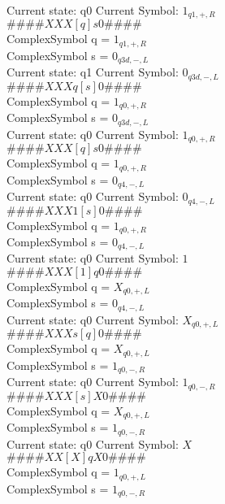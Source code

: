 \documentclass[10pt, a4paper]{article}
\begin{document}
 \medskip
Current state: q0	 Current Symbol: 	 $1_{q1,+,R}$\\
$\# \#\# \# X X X [ q ] s 0 \# \# \# \# $ \\
ComplexSymbol q = $1_{q1,+,R}$ \\
ComplexSymbol s = $0_{q3d,-,L}$ \\ 
 \medskip
Current state: q1	 Current Symbol: 	 $0_{q3d,-,L}$\\
$\# \#\# \# X X X q [ s ] 0 \# \# \# \# $ \\
ComplexSymbol q = $1_{q0,+,R}$ \\
ComplexSymbol s = $0_{q3d,-,L}$ \\ 
 \medskip
Current state: q0	 Current Symbol: 	 $1_{q0,+,R}$\\
$\# \#\# \# X X X [ q ] s 0 \# \# \# \# $ \\
ComplexSymbol q = $1_{q0,+,R}$ \\
ComplexSymbol s = $0_{q4,-,L}$ \\ 
 \medskip
Current state: q0	 Current Symbol: 	 $0_{q4,-,L}$\\
$\# \#\# \# X X X 1 [ s ] 0 \# \# \# \# $ \\
ComplexSymbol q = $1_{q0,+,R}$ \\
ComplexSymbol s = $0_{q4,-,L}$ \\ 
 \medskip
Current state: q0	 Current Symbol: 	 $1$\\
$\# \#\# \# X X X [ 1 ] q 0 \# \# \# \# $ \\
ComplexSymbol q = $X_{q0,+,L}$ \\
ComplexSymbol s = $0_{q4,-,L}$ \\ 
 \medskip
Current state: q0	 Current Symbol: 	 $X_{q0,+,L}$\\
$\# \#\# \# X X X s [ q ] 0 \# \# \# \# $ \\
ComplexSymbol q = $X_{q0,+,L}$ \\
ComplexSymbol s = $1_{q0,-,R}$ \\ 
 \medskip
Current state: q0	 Current Symbol: 	 $1_{q0,-,R}$\\
$\# \#\# \# X X X [ s ] X 0 \# \# \# \# $ \\
ComplexSymbol q = $X_{q0,+,L}$ \\
ComplexSymbol s = $1_{q0,-,R}$ \\ 
 \medskip
Current state: q0	 Current Symbol: 	 $X$\\
$\# \#\# \# X X [ X ] q X 0 \# \# \# \# $ \\
ComplexSymbol q = $1_{q0,+,L}$ \\
ComplexSymbol s = $1_{q0,-,R}$ \\ 
\end{document}
